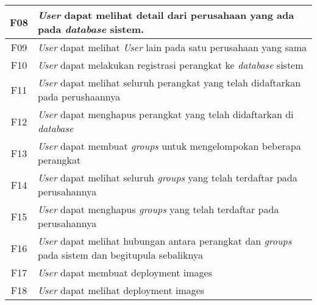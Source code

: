 \begin{table}[ht]
\begin{tabular}{|c|p{12cm}|}
    \\
    \hline
    F08 & \textit{User} dapat melihat detail dari perusahaan yang ada pada \textit{database} sistem.                      \\
    \hline
    F09 & \textit{User} dapat melihat \textit{User} lain pada satu perusahaan yang sama                                   \\
    \hline
    F10 & \textit{User} dapat melakukan registrasi perangkat ke \textit{database} sistem                                  \\
    \hline
    F11 & \textit{User} dapat melihat seluruh perangkat yang telah didaftarkan pada perushaannya                          \\
    \hline
    F12 & \textit{User} dapat menghapus perangkat yang telah didaftarkan di \textit{database}                             \\
    \hline
    F13 & \textit{User} dapat membuat \textit{groups} untuk mengelompokan beberapa perangkat                              \\
    \hline
    F14 & \textit{User} dapat melihat seluruh \textit{groups} yang telah terdaftar pada perusahannya                      \\
    \hline
    F15 & \textit{User} dapat menghapus \textit{groups} yang telah terdaftar pada perusahannya                            \\
    \hline
    F16 & \textit{User} dapat melihat hubungan antara perangkat dan \textit{groups} pada sistem dan begitupula sebaliknya \\
    \hline
    F17 & \textit{User} dapat membuat deployment images                                                                   \\
    \hline
    F18 & \textit{User} dapat melihat deployment images                                                                   \\
    \hline
  \end{tabular}
\end{table}
\egroup

\pagebreak

